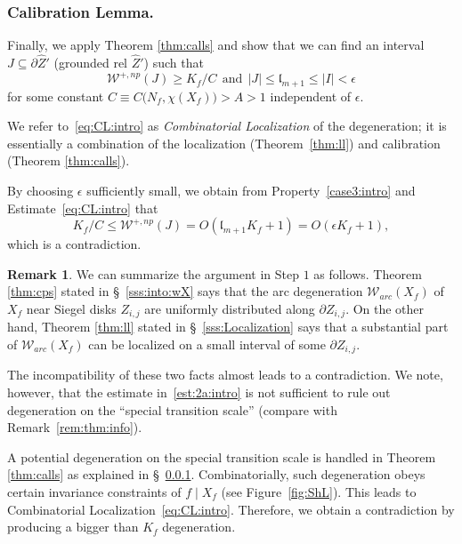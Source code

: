\documentclass[11pt, reqno]{amsart}
\numberwithin{equation}{section}
\theoremstyle{plain}
\theoremstyle{theorem}
\theoremstyle{plain}
\theoremstyle{definition}
\newtheorem{rmk}[theorem]{Remark}
\numberwithin{figure}{section}
\newcommand{\Width}{{\mathcal W}}
\newcommand{\length}{{\mathfrak l}}
\begin{document}
\subsubsection{Calibration Lemma.} \label{sss:Calibration} 
Finally, we apply Theorem \ref{thm:calls} and show that we can find an interval $J \subseteq \partial \widehat Z'$  (grounded rel $\widehat Z'$) such that
\begin{equation}
\label{eq:CL:intro}
\Width^{+, np} (J) \geq K_f/C \ \ \text{and} \ \ |J| \leq \length_{m+1} \leq |I| <\epsilon   
\end{equation}
for some constant $C\equiv C\big(N_f,\chi(X_f)\big) > A > 1$ independent of $\epsilon$. 

We refer to~\eqref{eq:CL:intro} as \emph{Combinatorial Localization} of the degeneration; it is essentially a combination of the localization (Theorem~\ref{thm:ll}) and calibration (Theorem \ref{thm:calls}). 


By choosing $\epsilon$ sufficiently small, we obtain from Property~\eqref{case3:intro} and Estimate~\eqref{eq:CL:intro} that   
$$
K_f/C \leq \Width^{+, np}(J)=O(\length_{m+1} K_f+1) = O(\epsilon K_f +1),
$$
which is a contradiction.


\begin{rmk}\label{rem:to:CL}
    We can summarize the argument in Step $1$ as follows. Theorem \ref{thm:cps} stated in \S~\ref{sss:into:wX} says that the arc degeneration $\mathcal{W}_{arc}(X_f)$ of $X_f$ near Siegel disks $Z_{i,j}$ are uniformly distributed along $\partial Z_{i,j}$. On the other hand, Theorem \ref{thm:ll} stated in \S~\ref{sss:Localization}  says that a substantial part of $\mathcal{W}_{arc}(X_f)$ can be localized on a small interval of some $\partial Z_{i,j}$.

    The incompatibility of these two facts almost leads to a contradiction. We note, however, that the estimate in~\eqref{est:2a:intro} is not sufficient to rule out degeneration on the ``special transition scale'' (compare with Remark~\ref{rem:thm:info}). 
    
    A potential degeneration on the special transition scale is handled in Theorem \ref{thm:calls} as explained in \S~\ref{sss:Calibration}. Combinatorially, such degeneration obeys certain invariance constraints of $f\mid X_f$ (see Figure~\ref{fig:ShL}). This leads to Combinatorial Localization~\eqref{eq:CL:intro}. Therefore, we obtain a contradiction by producing a bigger than $K_f$ degeneration.
\end{rmk}
\end{document}

